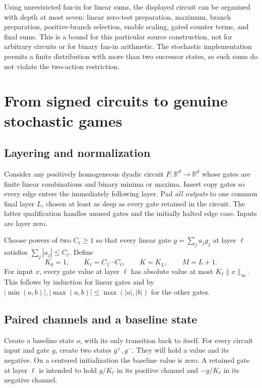 \documentclass[11pt,letterpaper]{article}
\theoremstyle{definition}
\theoremstyle{remark}
\newcommand{\R}{\mathbb R}
\begin{document}
Using unrestricted fan-in for linear sums, the displayed circuit can be
organized with depth at most seven: linear zero-test preparation, maximum,
branch preparation, positive-branch selection, enable scaling, gated
counter terms, and final sums. This is a bound for this particular source
construction, not for arbitrary circuits or for binary fan-in arithmetic.
The stochastic implementation permits a finite distribution with more
than two successor states, so such sums do not violate the two-action
restriction.

\section{From signed circuits to genuine stochastic games}
\label{ste:ec:sec:pipeline}

\subsection{Layering and normalization}

Consider any positively homogeneous dyadic circuit
$F:\R^d\to\R^d$ whose gates are finite linear combinations and binary
minima or maxima. Insert copy gates so every edge enters the immediately
following layer. Pad \emph{all outputs} to one common final layer $L$,
chosen at least as deep as every gate retained in the circuit. The latter
qualification handles unused gates and the initially halted edge case.
Inputs are layer zero.

Choose powers of two $C_\ell\geq1$ so that every linear gate
$g=\sum_j a_jg_j$ at layer $\ell$ satisfies
$\sum_j|a_j|\leq C_\ell$. Define
\begin{equation}
 K_0=1,\qquad K_\ell=C_1\cdots C_\ell,
 \qquad K=K_L,\qquad M=L+1.
 \label{ste:ec:eq:normalizers}
\end{equation}
For input $x$, every gate value at layer $\ell$ has absolute value at most
$K_\ell\|x\|_\infty$. This follows by induction for linear gates and by
$|\min(a,b)|,|\max(a,b)|\leq\max(|a|,|b|)$ for the other gates.

\subsection{Paired channels and a baseline state}

Create a baseline state $o$, with its only transition back to itself.
For every circuit input and gate $g$, create two states $g^+,g^-$. They
will hold a value and its negative. On a centered initialization the
baseline value is zero. A retained gate at layer $\ell$ is intended to
hold $g/K_\ell$ in its positive channel and $-g/K_\ell$ in its negative
channel.
\end{document}
